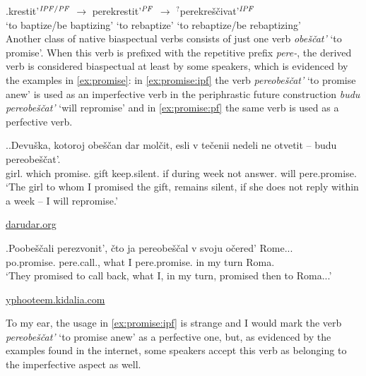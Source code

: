 \exg.\label{chain:baptize}krestit'$^{{\mathit{IPF}}/{\mathit{PF}}}$ $\rightarrow$ perekrestit'$^{\mathit{PF}}$ $\rightarrow$ $^?$perekre\v{s}\v{c}ivat'$^{\mathit{IPF}}$\\
{`to baptize/be baptizing'} {} {`to rebaptize'} {} {`to rebaptize/be rebaptizing'}\\

Another class of native biaspectual verbs consists of just one verb \textit{obe\v{s}\v{c}at'} `to promise'. When this verb is prefixed with the repetitive prefix \textit{pere-}, the derived verb is considered biaspectual at least by some speakers, which is evidenced by the examples in \ref{ex:promise}: in \ref{ex:promise:ipf} the verb \textit{pereobe\v{s}\v{c}at'} `to promise anew' is used as an imperfective verb in the periphrastic future construction \textit{budu pereobe\v{s}\v{c}at'} `will repromise' and in \ref{ex:promise:pf} the same verb is used as a perfective verb. 

\ex.\label{ex:promise}\ag.\label{ex:promise:ipf}Devu\v{s}ka, kotoroj obe\v{s}\v{c}an dar mol\v{c}it, esli {v te\v{c}enii} nedeli ne otvetit -- budu pereobe\v{s}\v{c}at'.\\
girl. which promise. gift keep.silent. if during week not answer.  will pere.promise.\\
\vspace{0.5em}
`The girl to whom I promised the gift, remains silent, if she does not reply within a week -- I will repromise.'
\begin{flushright}
\vspace{-0.5em}
\url{darudar.org}
\end{flushright}
\bg.\label{ex:promise:pf}Poobe\v{s}\v{c}ali perezvonit', \v{c}to ja pereobe\v{s}\v{c}al v svoju o\v{c}ered' Rome...\\
po.promise. pere.call., what I pere.promise. in my turn Roma.\\
\vspace{0.5em}
`They promised to call back, what I, in my turn, promised then to Roma...'
\begin{flushright}
\vspace{-0.5em}
\url{yphooteem.kidalia.com}
\end{flushright}

To my ear, the usage in \ref{ex:promise:ipf} is strange and I would mark the verb \textit{pereobe\v{s}\v{c}at'} `to promise anew' as a perfective one, but, as evidenced by the examples found in the internet, some speakers accept this verb as belonging to the imperfective aspect as well.


